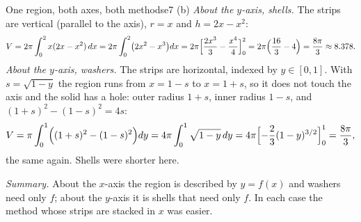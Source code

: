 \documentclass[11pt]{article}
\begin{document}
\begin{exmp}{One region, both axes, both methods}{e7}
(b) \emph{About the $y$-axis, shells.} The strips are vertical (parallel to the axis), $r=x$ and $h=2x-x^2$:
\[
V=2\pi\int_0^2x(2x-x^2)\,dx=2\pi\int_0^2\bigl(2x^2-x^3\bigr)dx=2\pi\Bigl[\frac{2x^3}3-\frac{x^4}4\Bigr]_0^2=2\pi\Bigl(\frac{16}3-4\Bigr)=\frac{8\pi}3\approx8.378 .
\]
\emph{About the $y$-axis, washers.} The strips are horizontal, indexed by $y\in[0,1]$. With $s=\sqrt{1-y}$ the region runs from $x=1-s$ to $x=1+s$, so it does not touch the axis and the solid has a hole: outer radius $1+s$, inner radius $1-s$, and $(1+s)^2-(1-s)^2=4s$:
\[
V=\pi\int_0^1\Bigl((1+s)^2-(1-s)^2\Bigr)dy=4\pi\int_0^1\sqrt{1-y}\,dy=4\pi\Bigl[-\frac23(1-y)^{3/2}\Bigr]_0^1=\frac{8\pi}3,
\]
the same again. Shells were shorter here.

\emph{Summary.} About the $x$-axis the region is described by $y=f(x)$ and washers need only $f$; about the $y$-axis it is shells that need only $f$. In each case the method whose strips are stacked in $x$ was easier.


\end{exmp}
\end{document}
